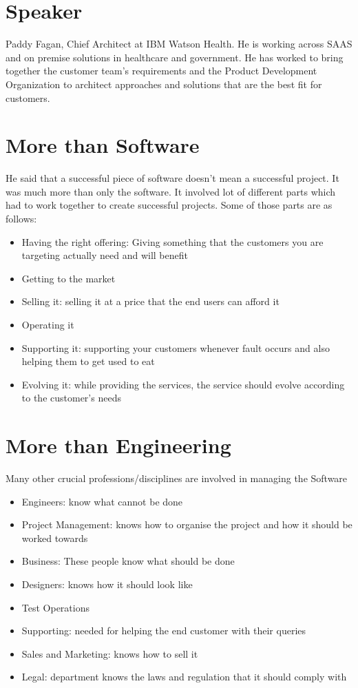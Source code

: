 \section{Speaker}

Paddy Fagan, Chief Architect at IBM Watson Health. He is working across SAAS and on premise solutions in healthcare and government. He has worked to bring together the customer team's requirements and the Product Development Organization to architect approaches and solutions that are the best fit for customers.

\section{More than Software}

He said that a successful piece of software doesn't mean a successful project. It was much more than only the software. It involved lot of different parts which had to work together to create successful projects. Some of those parts are as follows:

\begin{itemize}
    \item Having the right offering: Giving something that the customers you are targeting actually need and will benefit
    \item Getting to the market
    \item Selling it: selling it at a price that the end users can afford it
    \item Operating it
    \item Supporting it: supporting your customers whenever fault occurs and also helping them to get used to eat
    \item Evolving it: while providing the services, the service should evolve according to the customer's needs
\end{itemize}

\section{More than Engineering}

Many other crucial professions/disciplines are involved in managing the Software

\begin{itemize}
    \item Engineers: know what cannot be done
    \item Project Management: knows how to organise the project and how it should be worked towards
    \item Business: These people know what should be done
    \item Designers: knows how it should look like
    \item Test Operations
    \item Supporting: needed for helping the end customer with their queries
    \item Sales and Marketing: knows how to sell it
    \item Legal: department knows the laws and regulation that it should comply with
\end{itemize}

